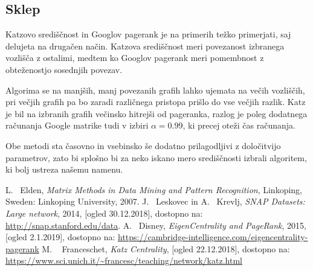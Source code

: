 \documentclass[12pt,a4paper]{amsart}
\begin{document}
\subsection{Sklep}
Katzovo središčnost in Googlov pagerank je na primerih težko primerjati, saj delujeta na drugačen način. Katzova središčnost meri povezanost izbranega vozlišča z ostalimi, medtem ko Googlov pagerank meri pomembnost z obteženostjo sosednjih povezav. 

Algorima se na manjših, manj povezanih grafih lahko ujemata na večih vozliščih, pri večjih grafih pa bo zaradi različnega pristopa prišlo do vse večjih razlik. Katz je bil na izbranih grafih večinsko hitrejši od pageranka, razlog je poleg dodatnega računanja Google matrike tudi v izbiri $\alpha = 0.99$, ki precej oteži čas računanja. 

Obe metodi sta časovno in vsebinsko še dodatno prilagodljivi z določitvijo parametrov, zato bi splošno bi za neko iskano mero središčnosti izbrali algoritem, ki bolj ustreza našemu namenu. 

\begin{thebibliography}{99}
 L. ~Elden, \emph{Matrix Methods in Data Mining and Pattern Recognition}, Linkoping, Sweden: Linkoping University, 2007.
 J. ~Leskovec in A. ~Krevlj, \emph{SNAP Datasets: Large network}, 2014, [ogled 30.12.2018], dostopno na: \url{http://snap.stanford.edu/data}.
 A. ~Disney, \emph{EigenCentrality and PageRank}, 2015, [ogled 2.1.2019], dostopno na: \url{https://cambridge-intelligence.com/eigencentrality-pagerank}
M. ~ Franceschet, \emph{Katz Centrality}, [ogled 22.12.2018], dostopno na: \url{https://www.sci.unich.it/~francesc/teaching/network/katz.html}
\end{thebibliography}
\end{document}
